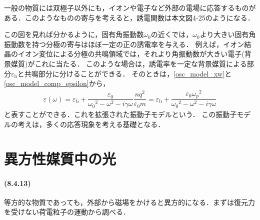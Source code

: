 一般の物質には双極子以外にも，イオンや電子など外部の電場に応答するものがある．このようなものの寄与を考えると，誘電関数は本文図4-25のようになる．

この図を見れば分かるように，固有角振動数$\omega_0$の近くでは，$\omega_0$より大きい固有角振動数を持つ分極の寄与はほぼ一定の正の誘電率を与える．
例えば，イオン結晶のイオン変位による分極の共鳴領域では，それより角振動数が大きい電子(背景媒質)がこれに当たる．
このような場合は，誘電率を一定な背景媒質による部分$\varepsilon_\text{b}$と共鳴部分に分けることができる．
そのときは，\eqref{osc_model_xw}と\eqref{osc_model_comp_epsilon}から，
\begin{align}
  \varepsilon(\omega)=\varepsilon_\text{b}+\dfrac{\varepsilon_0}{{\omega_0}^2 - \omega^2 - i\gamma\omega}\dfrac{nq^2}{\varepsilon_0m}=\varepsilon_\text{b}+\dfrac{\varepsilon_0{\omega_p}^2}{{\omega_0}^2 - \omega^2 - i\gamma\omega}\label{osc_model_extended}
\end{align}
と表すことができる．これを拡張された振動子モデルという．
この振動子モデルの考えは，多くの応答現象を考える基礎となる．

\setcounter{section}{3}
\section{異方性媒質中の光}
\paragraph{(8.4.13)}
等方的な物質であっても，外部から磁場をかけると異方的になる．まずは復元力を受けない荷電粒子の運動から調べる．


